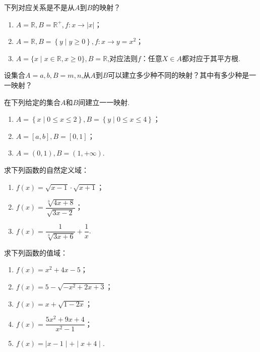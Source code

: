 \documentclass[lang=cn,math=cm,chinesefont=nofont,11pt,scheme=chinese,twocol]{elegantbook}
\begin{document}
\begin{exercise}\label{HS2FZ_lkb1_P34_exp.4,BJSZ_Algebra1_P40}
  下列对应关系是不是从$A$到$B$的映射？
\end{exercise}

\begin{enumerate}
  \item $A=\mathbb{R},B=\mathbb{R}^{+},f:x\rightarrow\left|x\right|$；
  \item $A=\mathbb{R},B=\left\{y\mid y\geqslant 0\right\},f:x\rightarrow y=x^2$；
  \item $A=\{x\mid x\in\mathbb{R},x\geqslant0\},B=\mathbb{R}$,对应法则$f$：任意$X\in A$都对应于其平方根.
\end{enumerate}

\begin{exercise}
  设集合$A={a,b},B={m,n}$,从$A$到$B$可以建立多少种不同的映射？其中有多少种是一一映射？
\end{exercise}

\begin{exercise}
  在下列给定的集合$A$和$B$间建立一一映射.
\end{exercise}

\begin{enumerate}
  \item $A=\left\{x\mid 0\leqslant x\leqslant 2\right\},B=\left\{y\mid 0\leqslant x\leqslant 4\right\}$；
  \item $A=[a,b],B=[0,1]$；
  \item $A=(0,1),B=(1,+\infty)$.
\end{enumerate}

\begin{exercise}
  求下列函数的自然定义域：
\end{exercise}

\begin{spacing}{1.8}
  \begin{enumerate}
  \item $f(x)=\sqrt{x-1}\cdot\sqrt{x+1}$；
  \item $f(x)=\dfrac{\sqrt[3]{4x+8}}{\sqrt{3x-2}}$；
  \item $f(x)=\dfrac1{\sqrt[3]{3x+6}}+\dfrac1x$.
  \end{enumerate}
\end{spacing}

\begin{exercise}
  求下列函数的值域：
\end{exercise}

\begin{enumerate}
  \item $f(x)=x^2+4x-5$；
  \item $f(x)=5-\sqrt{-x^{2}+2x+3}$；
  \item $f(x)=x+\sqrt{1-2x}$；
  \item \begin{spacing}{1.8}$f(x)=\dfrac{5x^{2}+9x+4}{x^{2}-1}$；\end{spacing}
  \item $f(x)=\mid x-1\mid+\mid x+4\mid $.
\end{enumerate}
\end{document}
